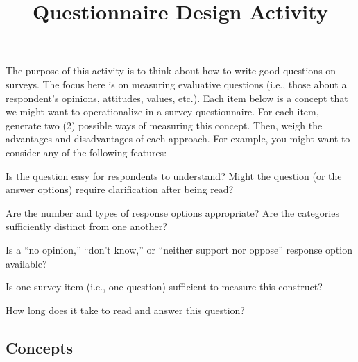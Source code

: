 \documentclass[a4, 12pt]{article}
\title{Questionnaire Design Activity\vspace{-2em}}
\author{}
\date{}
\begin{document}
\maketitle

\noindent The purpose of this activity is to think about how to write good questions on surveys. The focus here is on measuring evaluative questions (i.e., those about a respondent's opinions, attitudes, values, etc.). Each item below is a concept that we might want to operationalize in a survey questionnaire. For each item, generate two (2) possible ways of measuring this concept. Then, weigh the advantages and disadvantages of each approach. For example, you might want to consider any of the following features:

\begin{itemize*}
	\item Is the question easy for respondents to understand? Might the question (or the answer options) require clarification after being read?
	\item Are the number and types of response options appropriate? Are the categories sufficiently distinct from one another?
	\item Is a ``no opinion,'' ``don't know,'' or ``neither support nor oppose'' response option available?
	\item Is one survey item (i.e., one question) sufficient to measure this construct?
	\item How long does it take to read and answer this question?
\end{itemize*}


\subsection*{Concepts}

\onehalfspacing
\end{document}
